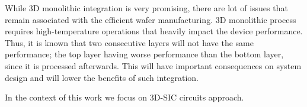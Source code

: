 While 3D monolithic integration is very promising, there are lot of issues that remain associated with the efficient wafer manufacturing. 3D monolithic process requires high-temperature operations that heavily impact the device performance. Thus, it is known that two consecutive layers will not have the same performance; the top layer having worse performance than the bottom layer, since it is processed afterwards. This will have important consequences on system design and will lower the benefits of such integration.

In the context of this work we focus on 3D-SIC circuits approach.
